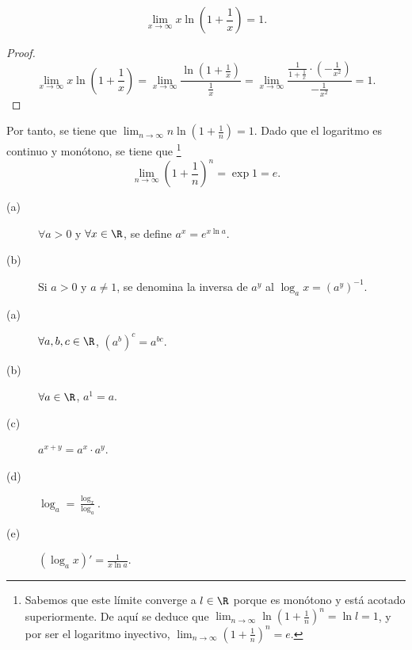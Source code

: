 \begin{ftheorem}[]
\normalfont 
\[\lim_{x \to \infty}x\ln\left(1+\frac{1}{x}\right) = 1 .\]
\end{ftheorem}
\begin{proof}
\[\lim_{x \to \infty}x\ln\left(1+\frac{1}{x}\right) = \lim_{x \to \infty}\frac{\ln\left(1+\frac{1}{x}\right)}{\frac{1}{x}} = \lim_{x \to \infty} \frac{\frac{1}{1+\frac{1}{x}} \cdot \left(-\frac{1}{x^{2}}\right)}{-\frac{1}{x^{2}}} = 1 .\]
\end{proof}
\begin{observation}
\normalfont Por tanto, se tiene que $\displaystyle \lim_{n \to \infty}n\ln\left(1 + \frac{1}{n}\right) = 1$. Dado que el logaritmo es continuo y monótono, se tiene que \footnote{Sabemos que este límite converge a $\displaystyle l \in \R $ porque es monótono y está acotado superiormente. De aquí se deduce que $\displaystyle \lim_{n \to \infty}\ln\left(1 + \frac{1}{n}\right)^{n} = \ln l = 1 $, y por ser el logaritmo inyectivo, $\displaystyle \lim_{n \to \infty}\left(1+\frac{1}{n}\right)^{n} = e $.} 
\[ \lim_{n \to \infty}\left(1 + \frac{1}{n}\right)^{n} = \exp 1 = e .\]
\end{observation}
\begin{fdefinition}[]
\normalfont 
\begin{description}
\item[(a)] $\displaystyle \forall a > 0 $ y $\displaystyle \forall x \in \R $, se define $\displaystyle a^{x} = e^{x\ln a}  $.
\item[(b)] Si $\displaystyle a > 0 $ y $\displaystyle a \neq 1 $, se denomina la inversa de $\displaystyle a^{y} $ al $\displaystyle \log_{a}x = \left(a^{y}\right)^{-1} $.
\end{description}
\end{fdefinition}
\begin{fprop}[]
\normalfont 
\begin{description}
\item[(a)] $\displaystyle \forall a,b,c \in \R $, $\displaystyle \left(a^{b}\right)^{c} = a^{bc} $.
\item[(b)] $\displaystyle \forall a \in \R $, $\displaystyle a^{1} = a $.
\item[(c)] $\displaystyle a^{x + y}= a^{x} \cdot a^{y} $.
\item[(d)] $\displaystyle \log_{a} = \frac{\log_{x}}{\log_{a}} $.
\item[(e)] $\displaystyle \left(\log_{a}x\right)' = \frac{1}{x\ln a} $.
\end{description}
\end{fprop}
